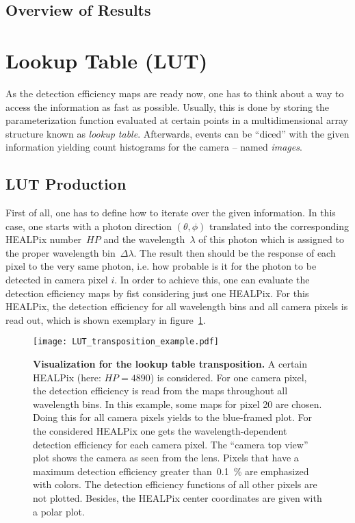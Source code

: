 \subsection{Overview of Results}



\section{Lookup Table (LUT)}

As the detection efficiency maps are ready now, one has to think about a way to access the information as fast as possible. Usually, this is done by storing the parameterization function evaluated at certain points in a multidimensional array structure known as \textit{lookup table}. Afterwards, events can be \enquote{diced} with the given information yielding count histograms for the camera -- named \textit{images}.

\subsection{LUT Production}\label{sec:lut_production}

First of all, one has to define how to iterate over the given information. In this case, one starts with a photon direction $(\theta,\phi)$ translated into the corresponding HEALPix number~$HP$ and the wavelength~$\lambda$ of this photon which is assigned to the proper wavelength bin~$\Delta\lambda$. The result then should be the response of each pixel to the very same photon, i.e. how probable is it for the photon to be detected in camera pixel $i$. In order to achieve this, one can evaluate the detection efficiency maps by fist considering just one HEALPix. For this HEALPix, the detection efficiency for all wavelength bins and all camera pixels is read out, which is shown exemplary in figure~\ref{lut:transpose_example}. 

\begin{figure}[H]
	\texttt{[image: LUT\_transposition\_example.pdf]}
	\caption[Visualization for the lookup table transposition]{\textbf{Visualization for the lookup table transposition.} A certain HEALPix (here: $HP=\num{4890}$) is considered. For one camera pixel, the detection efficiency is read from the maps throughout all wavelength bins. In this example, some maps for pixel \num{20} are chosen. Doing this for all camera pixels yields to the blue-framed plot. For the considered HEALPix one gets the wavelength-dependent detection efficiency for each camera pixel. The \enquote{camera top view} plot shows the camera as seen from the lens. Pixels that have a maximum detection efficiency greater than~\SI{0.1}{\percent} are emphasized with colors. The detection efficiency functions of all other pixels are not plotted. Besides, the HEALPix center coordinates are given with a polar plot.}
	\label{lut:transpose_example}
\end{figure}

